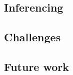\documentclass[12pt, a4paper, lithuanian]{article}
\begin{document}
\subsection{Inferencing}

\subsection{Challenges}

\subsection{Future work}
\end{document}

